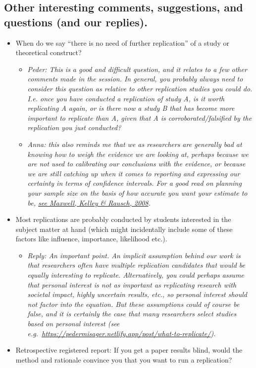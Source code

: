 \documentclass[
]{article}
\providecommand{\tightlist}{%
  \setlength{\itemsep}{0pt}\setlength{\parskip}{0pt}}
\begin{document}
\hypertarget{other-interesting-comments-suggestions-and-questions-and-our-replies.}{%
\subsection{Other interesting comments, suggestions, and questions (and
our
replies).}\label{other-interesting-comments-suggestions-and-questions-and-our-replies.}}

\begin{itemize}
\item
  When do we say ``there is no need of further replication'' of a study
  or theoretical construct?

  \begin{itemize}
  \item
    \emph{Peder: This is a good and difficult question, and it relates
    to a few other comments made in the session. In general, you
    probably always need to consider this question as relative to other
    replication studies you could do. I.e. once you have conducted a
    replication of study A, is it worth replicating A again, or is there
    now a study B that has become more important to replicate than A,
    given that A is corroborated/falsified by the replication you just
    conducted? }
  \item
    \emph{Anna: this also reminds me that we as researchers are
    generally bad at knowing how to weigh the evidence we are looking
    at, perhaps because we are not used to calibrating our conclusions
    with the evidence, or because we are still catching up when it comes
    to reporting and expressing our certainty in terms of confidence
    intervals. For a good read on planning your sample size on the basis
    of how accurate you want your estimate to be,
    \href{10.1146/annurev.psych.59.103006.093735}{see Maxwell, Kelley \&
    Rausch, 2008}.}
  \end{itemize}
\item
  Most replications are probably conducted by students interested in the
  subject matter at hand (which might incidentally include some of these
  factors like influence, importance, likelihood etc.).

  \begin{itemize}
  \tightlist
  \item
    \emph{Reply: An important point. An implicit assumption behind our
    work is that researchers often have multiple replication candidates
    that would be equally interesting to replicate. Alternatively, you
    could perhaps assume that personal interest is not as important as
    replicating research with societal impact, highly uncertain results,
    etc., so personal interest should not factor into the equation. But
    these assumptions could of course be false, and it is certainly the
    case that many researchers select studies based on personal interest
    (see
    e.g.~\url{https://pedermisager.netlify.app/post/what-to-replicate/}).}
  \end{itemize}
\item
  Retrospective registered report: If you get a paper results blind,
  would the method and rationale convince you that you want to run a
  replication?


\end{itemize}
\end{document}
